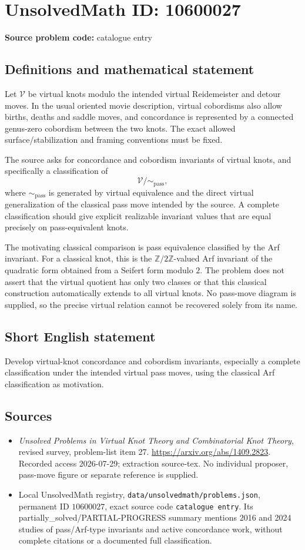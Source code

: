 \documentclass[11pt]{article}
\newcommand{\Z}{\mathbb{Z}}
\begin{document}
\section*{UnsolvedMath ID: 10600027}
\textbf{Source problem code:} catalogue entry
\subsection{Definitions and mathematical statement}
Let \(\mathcal V\) be virtual knots modulo the intended virtual Reidemeister and detour moves. In the usual oriented movie description, virtual cobordisms also allow births, deaths and saddle moves, and concordance is represented by a connected genus-zero cobordism between the two knots. The exact allowed surface/stabilization and framing conventions must be fixed.

The source asks for concordance and cobordism invariants of virtual knots, and specifically a classification of
\[
 \mathcal V/\!\sim_{\mathrm{pass}},
\]
where \(\sim_{\mathrm{pass}}\) is generated by virtual equivalence and the direct virtual generalization of the classical pass move intended by the source. A complete classification should give explicit realizable invariant values that are equal precisely on pass-equivalent knots.

The motivating classical comparison is pass equivalence classified by the Arf invariant. For a classical knot, this is the \(\Z/2\Z\)-valued Arf invariant of the quadratic form obtained from a Seifert form modulo \(2\). The problem does not assert that the virtual quotient has only two classes or that this classical construction automatically extends to all virtual knots. No pass-move diagram is supplied, so the precise virtual relation cannot be recovered solely from its name.
\subsection{Short English statement}
Develop virtual-knot concordance and cobordism invariants, especially a complete classification under the intended virtual pass moves, using the classical Arf classification as motivation.
\subsection{Sources}
\begin{itemize}
\item \emph{Unsolved Problems in Virtual Knot Theory and Combinatorial Knot Theory}, revised survey, problem-list item 27. \url{https://arxiv.org/abs/1409.2823}. Recorded access 2026-07-29; extraction source-tex. No individual proposer, pass-move figure or separate reference is supplied.
\item Local UnsolvedMath registry, \texttt{data/unsolvedmath/problems.json}, permanent ID \(10600027\), exact source code \texttt{catalogue entry}. Its partially\_solved/PARTIAL-PROGRESS summary mentions 2016 and 2024 studies of pass/Arf-type invariants and active concordance work, without complete citations or a documented full classification.
\end{itemize}
\end{document}
